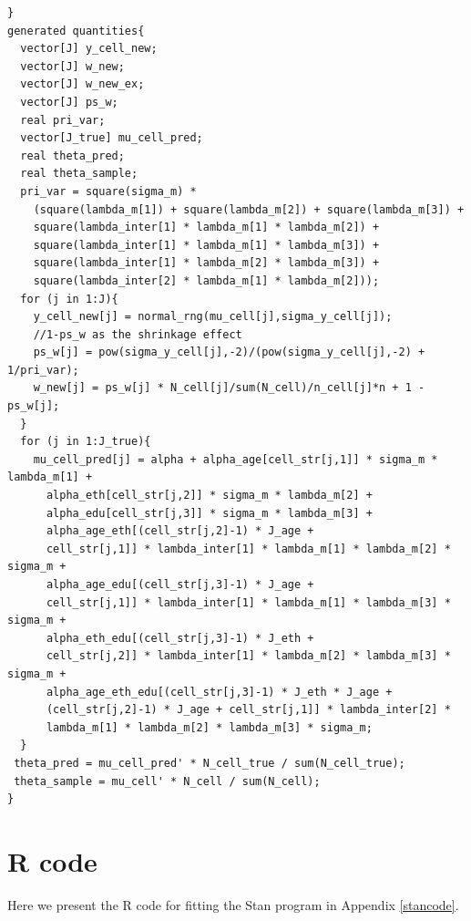\documentclass[11pt]{article}
\begin{document}
\begin{small}
\begin{verbatim}
}
generated quantities{
  vector[J] y_cell_new;
  vector[J] w_new;
  vector[J] w_new_ex;
  vector[J] ps_w;
  real pri_var;
  vector[J_true] mu_cell_pred;
  real theta_pred;
  real theta_sample;
  pri_var = square(sigma_m) *
    (square(lambda_m[1]) + square(lambda_m[2]) + square(lambda_m[3]) + 
    square(lambda_inter[1] * lambda_m[1] * lambda_m[2]) +
    square(lambda_inter[1] * lambda_m[1] * lambda_m[3]) +
    square(lambda_inter[1] * lambda_m[2] * lambda_m[3]) +
    square(lambda_inter[2] * lambda_m[1] * lambda_m[2]));
  for (j in 1:J){
    y_cell_new[j] = normal_rng(mu_cell[j],sigma_y_cell[j]);
    //1-ps_w as the shrinkage effect
    ps_w[j] = pow(sigma_y_cell[j],-2)/(pow(sigma_y_cell[j],-2) + 1/pri_var); 
    w_new[j] = ps_w[j] * N_cell[j]/sum(N_cell)/n_cell[j]*n + 1 - ps_w[j];
  }
  for (j in 1:J_true){
    mu_cell_pred[j] = alpha + alpha_age[cell_str[j,1]] * sigma_m * lambda_m[1] + 
      alpha_eth[cell_str[j,2]] * sigma_m * lambda_m[2] + 
      alpha_edu[cell_str[j,3]] * sigma_m * lambda_m[3] +
      alpha_age_eth[(cell_str[j,2]-1) * J_age + 
      cell_str[j,1]] * lambda_inter[1] * lambda_m[1] * lambda_m[2] * sigma_m +
      alpha_age_edu[(cell_str[j,3]-1) * J_age + 
      cell_str[j,1]] * lambda_inter[1] * lambda_m[1] * lambda_m[3] * sigma_m +
      alpha_eth_edu[(cell_str[j,3]-1) * J_eth + 
      cell_str[j,2]] * lambda_inter[1] * lambda_m[2] * lambda_m[3] * sigma_m + 
      alpha_age_eth_edu[(cell_str[j,3]-1) * J_eth * J_age + 
      (cell_str[j,2]-1) * J_age + cell_str[j,1]] * lambda_inter[2] * 
      lambda_m[1] * lambda_m[2] * lambda_m[3] * sigma_m;
  }
 theta_pred = mu_cell_pred' * N_cell_true / sum(N_cell_true);
 theta_sample = mu_cell' * N_cell / sum(N_cell);
}
\end{verbatim}\end{small}

\section{R code}
Here we present the R code for fitting the Stan program in Appendix \ref{stancode}.
\end{document}
